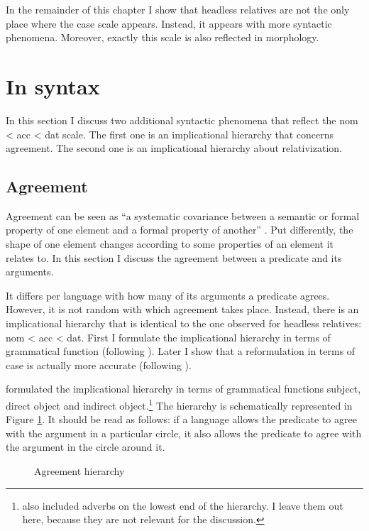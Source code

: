 In the remainder of this chapter I show that headless relatives are not the only place where the case scale appears. Instead, it appears with more syntactic phenomena. Moreover, exactly this scale is also reflected in morphology.


\section{In syntax}\label{sec:impl-hier}

In this section I discuss two additional syntactic phenomena that reflect the \ac{nom} < \ac{acc} < \ac{dat} scale. The first one is an implicational hierarchy that concerns agreement. The second one is an implicational hierarchy about relativization.


\subsection{Agreement}

Agreement can be seen as ``a systematic covariance between a semantic or formal property of one element and a formal property of another'' \citep{steel1978}. Put differently, the shape of one element changes according to some properties of an element it relates to. In this section I discuss the agreement between a predicate and its arguments.

It differs per language with how many of its arguments a predicate agrees. However, it is not random with which agreement takes place. Instead, there is an implicational hierarchy that is identical to the one observed for headless relatives: \ac{nom} < \ac{acc} < \ac{dat}. First I formulate the implicational hierarchy in terms of grammatical function (following \citealt{moravcsik1978}). Later I show that a reformulation in terms of case is actually more accurate (following \citealt{bobaljik2006}).

\citet{moravcsik1978} formulated the implicational hierarchy in terms of grammatical functions subject, direct object and indirect object.\footnote{
\citet{moravcsik1978} also included adverbs on the lowest end of the hierarchy. I leave them out here, because they are not relevant for the discussion.
}
The hierarchy is schematically represented in Figure \ref{fig:agr-sub-do-io}. It should be read as follows: if a language allows the predicate to agree with the argument in a particular circle, it also allows the predicate to agree with the argument in the circle around it.

\begin{figure}[ht]
  \centering
  \caption{Agreement hierarchy}
  \label{fig:agr-sub-do-io}
\end{figure}

